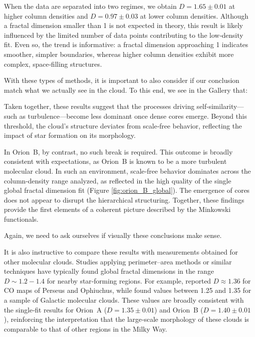 When the data are separated into two regimes, we obtain \(D = 1.65 \pm 0.01\) at higher column densities and \(D = 0.97 \pm 0.03\) at lower column densities.  
Although a fractal dimension smaller than 1 is not expected in theory, this result is likely influenced by the limited number of data points contributing to the low‑density fit.  
Even so, the trend is informative: a fractal dimension approaching 1 indicates smoother, simpler boundaries, whereas higher column densities exhibit more complex, space‑filling structures.

With these types of methods, it is important to also consider if our conclusion match what we actually see in the cloud. To this end, we see in the Gallery that: 

Taken together, these results suggest that the processes driving self‑similarity—such as turbulence—become less dominant once dense cores emerge.  
Beyond this threshold, the cloud’s structure deviates from scale‑free behavior, reflecting the impact of star formation on its morphology.

In Orion~B, by contrast, no such break is required.  
This outcome is broadly consistent with expectations, as Orion~B is known to be a more turbulent molecular cloud.  
In such an environment, scale‑free behavior dominates across the column‑density range analyzed, as reflected in the high quality of the single global fractal dimension fit (Figure \ref{fig:orion_B_global}).  
The emergence of cores does not appear to disrupt the hierarchical structuring.  
Together, these findings provide the first elements of a coherent picture described by the Minkowski functionals.

Again, we need to ask ourselves if visually these conclusions make sense.

It is also instructive to compare these results with measurements obtained for other molecular clouds.  
Studies applying perimeter–area methods or similar techniques have typically found global fractal dimensions in the range \(D \sim 1.2{-}1.4\) for nearby star‑forming regions.  
For example, \cite{falgarone1991hierarchical} reported \(D \approx 1.36\) for CO maps of Perseus and Ophiuchus, while \cite{sanchez2005fractal} found values between 1.25 and 1.35 for a sample of Galactic molecular clouds.  
These values are broadly consistent with the single‑fit results for Orion~A (\(D = 1.35 \pm 0.01\)) and Orion~B (\(D = 1.40 \pm 0.01\)), reinforcing the interpretation that the large‑scale morphology of these clouds is comparable to that of other regions in the Milky Way.

